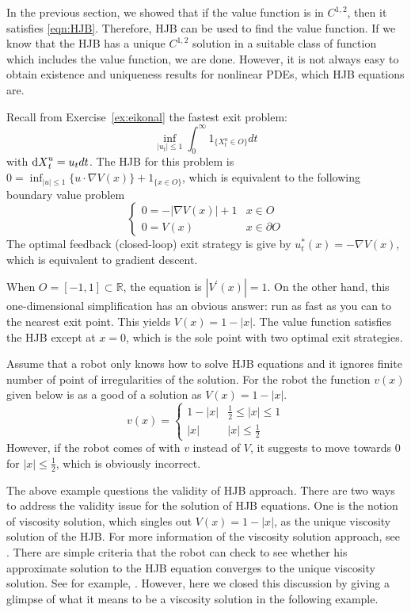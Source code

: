 \documentclass[11pt]{book}
\newcommand{\dX}{\text{\normalfont d}X}
\begin{document}
In the previous section, we showed that if the value function is in $C^{1,2}$, then it satisfies \eqref{eqn:HJB}. Therefore, HJB can be used to find the value function. If we know that the HJB has a unique $C^{1,2}$ solution in a suitable class of function which includes the value function, we are done. However, it is not always easy to obtain existence and uniqueness results for nonlinear PDEs, which HJB equations are. 
\begin{eg}
Recall from Exercise~\ref{ex:eikonal} the fastest exit problem:
\begin{equation}
    \inf_{|u_t|\le 1}\int_0^\infty 1_{\{X^u_t\in O\}} dt
\end{equation}
with ${\dX}_t^u=u_t dt$.
   The HJB for this problem is $0=\inf_{|u|\le 1}\{u\cdot \nabla V(x)\}+1_{\{x\in O\}}$, which is equivalent to the following boundary value problem
   \begin{equation}
   \begin{cases}
       0=-|\nabla V(x)|+1& x\in O\\
       0=V(x)& x\in\partial O
   \end{cases}
   \end{equation}
The optimal feedback (closed-loop) exit strategy is give by $u^*_t(x)=-\nabla V(x)$, which is equivalent to gradient descent.
   
When $O=[-1,1]\subset\mathbb{R}$, the equation is $|V^\prime(x)|=1$. On the other hand, this one-dimensional simplification has an obvious answer: run as fast as you can to the nearest exit point. This yields $V(x)=1-|x|$. The value function satisfies the HJB except at $x=0$, which is the sole point with two optimal exit strategies.

Assume that a robot only knows how to solve HJB equations and it ignores finite number of point of irregularities of the solution. For the robot the function $v(x)$ given below is as a good of a solution as $V(x)=1-|x|$. 
\begin{equation}
    v(x)=
    \begin{cases}
        1-|x| & \frac12\le |x| \le 1\\
        |x| & |x|\le \frac12
    \end{cases}
\end{equation}
However, if the robot comes of with $v$ instead of $V$, it suggests to move towards $0$ for $|x|\le \frac12$, which is obviously incorrect. 
\end{eg}
The above example questions the validity of HJB approach. There are two ways to address the validity issue for the solution of HJB equations. One is the notion of viscosity solution, which singles out $V(x)=1-|x|$, as the unique viscosity solution of the HJB. For more information of the viscosity solution approach, see \cite{CIL92}. There are simple criteria that the robot can check to see whether his approximate solution to the HJB equation converges to the unique viscosity solution. See for example, \cite{Barles-Souganidis91}. However, here we closed this discussion by giving a glimpse of what it means to be a viscosity solution in the following example.
\end{document}
